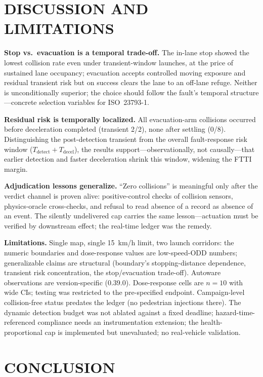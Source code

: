 \documentclass[letterpaper, 10pt, conference]{ieeeconf}
\begin{document}
\section{DISCUSSION AND LIMITATIONS}

\textbf{Stop vs.\ evacuation is a temporal trade-off.} The in-lane stop
showed the lowest collision rate even under transient-window launches, at
the price of sustained lane occupancy; evacuation accepts controlled moving
exposure and residual transient risk but on success clears the lane to an
off-lane refuge. Neither is unconditionally superior; the choice should follow the
fault's temporal structure---concrete selection variables for
ISO~23793-1.

\textbf{Residual risk is temporally localized.} All evacuation-arm
collisions occurred before deceleration completed (transient 2/2), none
after settling (0/8). Distinguishing the post-detection transient from the overall
fault-response risk window ($T_{\mathrm{detect}}+T_{\mathrm{decel}}$), the
results support---observationally, not causally---that earlier detection
and faster deceleration shrink this window, widening the FTTI margin.

\textbf{Adjudication lessons generalize.} ``Zero collisions'' is
meaningful only after the verdict channel is proven alive:
positive-control checks of collision sensors, physics-oracle cross-checks,
and refusal to read absence of a record as absence of an event. The
silently undelivered cap carries the same lesson---actuation must be
verified by downstream effect; the real-time ledger was the remedy.

\textbf{Limitations.} Single map, single 15~km/h limit, two launch
corridors: the numeric boundaries and dose-response values are
low-speed-ODD numbers; generalizable claims are structural (boundary's
stopping-distance dependence, transient risk concentration, the
stop/evacuation trade-off). Autoware observations are version-specific
(0.39.0). Dose-response cells are $n{=}10$ with wide CIs; testing was
restricted to the pre-specified endpoint. Campaign-level collision-free
status predates the ledger (no pedestrian injections there). The dynamic
detection budget was not ablated against a fixed deadline;
hazard-time-referenced compliance needs an instrumentation extension; the
health-proportional cap is implemented but unevaluated; no real-vehicle
validation.

\section{CONCLUSION}
\end{document}
